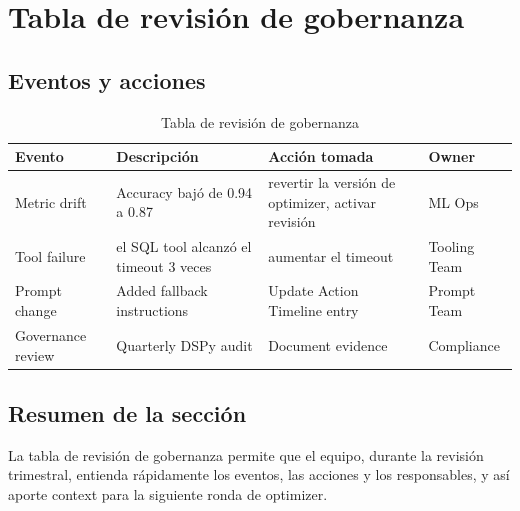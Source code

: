 \section{Tabla de revisión de gobernanza}

\subsection{Eventos y acciones}

\begin{table}[H]
\centering
\caption{Tabla de revisión de gobernanza}
\begin{tabular}{p{}p{}p{}p{}}
\toprule
Evento & Descripción & Acción tomada & Owner \\
\midrule
Metric drift & Accuracy bajó de 0.94 a 0.87 & revertir la versión de optimizer, activar revisión & ML Ops \\
Tool failure & el SQL tool alcanzó el timeout 3 veces & aumentar el timeout & Tooling Team \\
Prompt change & Added fallback instructions & Update Action Timeline entry & Prompt Team \\
Governance review & Quarterly DSPy audit & Document evidence & Compliance \\
\bottomrule
\end{tabular}
\end{table}

\subsection{Resumen de la sección}

La tabla de revisión de gobernanza permite que el equipo, durante la revisión trimestral, entienda rápidamente los eventos, las acciones y los responsables, y así aporte context para la siguiente ronda de optimizer.

